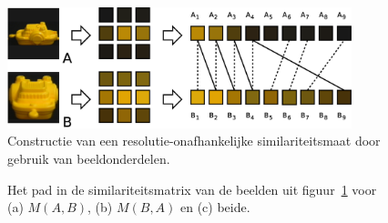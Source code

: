 
\begin{figure}[bp]
\vspace{10pt}
\centering
\includegraphics[width=10cm]{images/multires.eps}
\caption{\label{fig:multires}Constructie van een resolutie-onafhankelijke similariteitsmaat 
door gebruik van beeldonderdelen.}
\end{figure}

\begin{figure}[!bp]
\vspace{10pt}
\centering
{}
\caption{\label{fig:multires_sim-matrices}Het pad in de similariteitsmatrix van de beelden uit 
figuur~\ref{fig:multires} voor (a) $M(A,B)$, (b) $M(B,A)$ en (c) beide.}
\end{figure}

